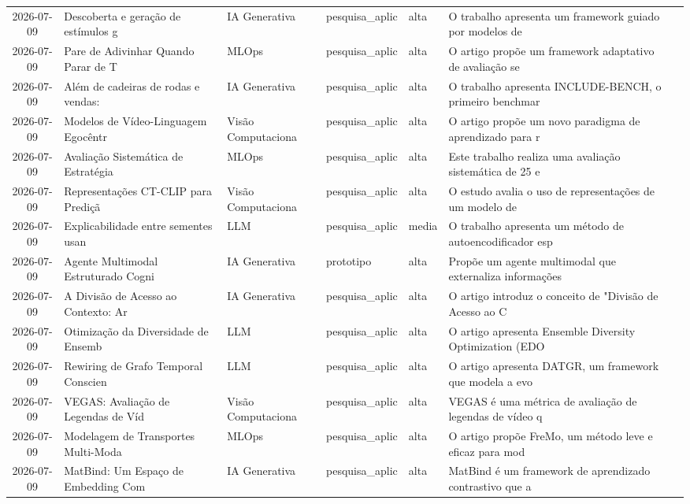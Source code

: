 \documentclass[
  brazilian,
  11pt,
  letterpaper,
  DIV=11,
  numbers=noendperiod]{scrartcl}
\begin{document}
\begin{table}
{\begin{threeparttable}
\begin{tabular}{cp{1.2cm}p{3.5cm}p{2cm}p{1.8cm}p{1.2cm}p{4cm}}
    2026-07-09 & Descoberta e geração de estímulos g & IA Generativa & pesquisa\_aplic & alta & O trabalho apresenta um framework guiado por modelos de \\
    2026-07-09 & Pare de Adivinhar Quando Parar de T & MLOps & pesquisa\_aplic & alta & O artigo propõe um framework adaptativo de avaliação se \\
    2026-07-09 & Além de cadeiras de rodas e vendas: & IA Generativa & pesquisa\_aplic & alta & O trabalho apresenta INCLUDE-BENCH, o primeiro benchmar \\
    2026-07-09 & Modelos de Vídeo-Linguagem Egocêntr & Visão Computaciona & pesquisa\_aplic & alta & O artigo propõe um novo paradigma de aprendizado para r \\
    2026-07-09 & Avaliação Sistemática de Estratégia & MLOps & pesquisa\_aplic & alta & Este trabalho realiza uma avaliação sistemática de 25 e \\
    2026-07-09 & Representações CT-CLIP para Prediçã & Visão Computaciona & pesquisa\_aplic & alta & O estudo avalia o uso de representações de um modelo de \\
    2026-07-09 & Explicabilidade entre sementes usan & LLM & pesquisa\_aplic & media & O trabalho apresenta um método de autoencodificador esp \\
    2026-07-09 & Agente Multimodal Estruturado Cogni & IA Generativa & prototipo & alta & Propõe um agente multimodal que externaliza informações \\
    2026-07-09 & A Divisão de Acesso ao Contexto: Ar & IA Generativa & pesquisa\_aplic & alta & O artigo introduz o conceito de "Divisão de Acesso ao C \\
    2026-07-09 & Otimização da Diversidade de Ensemb & LLM & pesquisa\_aplic & alta & O artigo apresenta Ensemble Diversity Optimization (EDO \\
    2026-07-09 & Rewiring de Grafo Temporal Conscien & LLM & pesquisa\_aplic & alta & O artigo apresenta DATGR, um framework que modela a evo \\
    2026-07-09 & VEGAS: Avaliação de Legendas de Víd & Visão Computaciona & pesquisa\_aplic & alta & VEGAS é uma métrica de avaliação de legendas de vídeo q \\
    2026-07-09 & Modelagem de Transportes Multi-Moda & MLOps & pesquisa\_aplic & alta & O artigo propõe FreMo, um método leve e eficaz para mod \\
    2026-07-09 & MatBind: Um Espaço de Embedding Com & IA Generativa & pesquisa\_aplic & alta & MatBind é um framework de aprendizado contrastivo que a \\

\end{tabular}
\end{threeparttable}}
\end{table}
\end{document}
